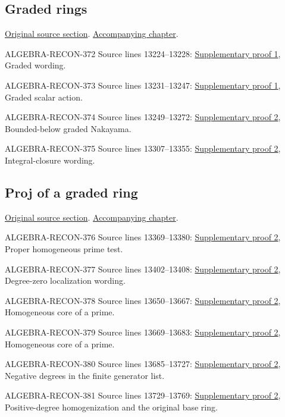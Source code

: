 \subsection{Graded rings}
\hypertarget{algebra-source-section-graded}{}
\noindent\href{https://github.com/stacks/stacks-project/blob/a04446e57ec1fbc252a871afcec7752fb2807b14/algebra.tex\#L13199}{Original source section}. \href{algebra.pdf\#nameddest=section-graded}{Accompanying chapter}.

\begin{AlgebraSourceRoutes}
\item[ALGEBRA-RECON-372] Source lines 13224--13228: \hyperlink{algebra_localization_kgroups_graded_notes_20260927}{Supplementary proof 1}, Graded wording.
\item[ALGEBRA-RECON-373] Source lines 13231--13247: \hyperlink{algebra_localization_kgroups_graded_notes_20260927}{Supplementary proof 1}, Graded scalar action.
\item[ALGEBRA-RECON-374] Source lines 13249--13272: \hyperlink{algebra_graded_proj_hilbert_notes_20260927}{Supplementary proof 2}, Bounded-below graded Nakayama.
\item[ALGEBRA-RECON-375] Source lines 13307--13355: \hyperlink{algebra_graded_proj_hilbert_notes_20260927}{Supplementary proof 2}, Integral-closure wording.
\end{AlgebraSourceRoutes}

\subsection{Proj of a graded ring}
\hypertarget{algebra-source-section-proj}{}
\noindent\href{https://github.com/stacks/stacks-project/blob/a04446e57ec1fbc252a871afcec7752fb2807b14/algebra.tex\#L13364}{Original source section}. \href{algebra.pdf\#nameddest=section-proj}{Accompanying chapter}.

\begin{AlgebraSourceRoutes}
\item[ALGEBRA-RECON-376] Source lines 13369--13380: \hyperlink{algebra_graded_proj_hilbert_notes_20260927}{Supplementary proof 2}, Proper homogeneous prime test.
\item[ALGEBRA-RECON-377] Source lines 13402--13408: \hyperlink{algebra_graded_proj_hilbert_notes_20260927}{Supplementary proof 2}, Degree-zero localization wording.
\item[ALGEBRA-RECON-378] Source lines 13650--13667: \hyperlink{algebra_graded_proj_hilbert_notes_20260927}{Supplementary proof 2}, Homogeneous core of a prime.
\item[ALGEBRA-RECON-379] Source lines 13669--13683: \hyperlink{algebra_graded_proj_hilbert_notes_20260927}{Supplementary proof 2}, Homogeneous core of a prime.
\item[ALGEBRA-RECON-380] Source lines 13685--13727: \hyperlink{algebra_graded_proj_hilbert_notes_20260927}{Supplementary proof 2}, Negative degrees in the finite generator list.
\item[ALGEBRA-RECON-381] Source lines 13729--13769: \hyperlink{algebra_graded_proj_hilbert_notes_20260927}{Supplementary proof 2}, Positive-degree homogenization and the original base ring.
\end{AlgebraSourceRoutes}

